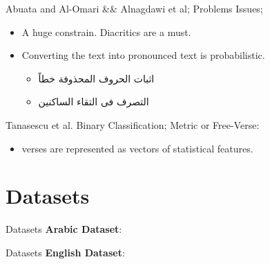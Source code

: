 \documentclass[10pt]{beamer}
\begin{document}
\begin{frame}[fragile]{Abuata and Al-Omari \&\& Alnagdawi et al; Problems}
Issues;
    \begin{itemize}
       \item A huge constrain. \alert{Diacritics} are a must.
       \item Converting the text into pronounced text is \alert{probabilistic}.
            \begin{itemize}
                \item \textarabic{اثبات الحروف المحذوفة خطاً}
                \item \textarabic{التصرف فى التقاء الساكنين}
            \end{itemize}
    \end{itemize}
\end{frame}




\begin{frame}[fragile]{Tanasescu et al.}
Binary Classification; Metric or Free-Verse: 
        \begin{itemize}
            \item verses are represented as vectors of statistical features.
        \end{itemize}
\end{frame}


\section{Datasets}
\begin{frame}[fragile]{Datasets}
\textbf{Arabic Dataset}:
\begin{center}

\end{center}
\end{frame}

\begin{frame}[fragile]{Datasets}
\textbf{English Dataset}:
\begin{center}

\end{center}
\end{frame}
\end{document}
